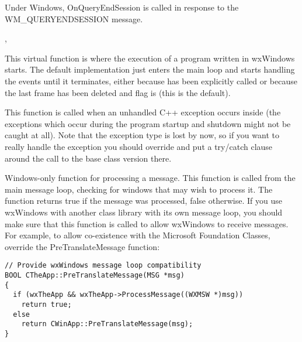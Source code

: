Under Windows, OnQueryEndSession is called in response to the WM\_QUERYENDSESSION message.


,\rtfsp
{}


\label{wxapponrun}


This virtual function is where the execution of a program written in wxWindows
starts. The default implementation just enters the main loop and starts
handling the events until it terminates, either because 
 has been explicitly called or because
the last frame has been deleted and 
 flag is \true (this
is the default).


\label{wxapponunhandledexception}


This function is called when an unhandled C++ exception occurs inside 
 (the exceptions which occur during the program
startup and shutdown might not be caught at all).
Note that the exception type is lost by now, so if you want to really handle
the exception you should override  and put a
try/catch clause around the call to the base class version there.


\label{wxappprocessmessage}


Windows-only function for processing a message. This function
is called from the main message loop, checking for windows that
may wish to process it. The function returns true if the message
was processed, false otherwise. If you use wxWindows with another class
library with its own message loop, you should make sure that this
function is called to allow wxWindows to receive messages. For example,
to allow co-existence with the Microsoft Foundation Classes, override
the PreTranslateMessage function:

\begin{verbatim}
// Provide wxWindows message loop compatibility
BOOL CTheApp::PreTranslateMessage(MSG *msg)
{
  if (wxTheApp && wxTheApp->ProcessMessage((WXMSW *)msg))
    return true;
  else
    return CWinApp::PreTranslateMessage(msg);
}
\end{verbatim}


